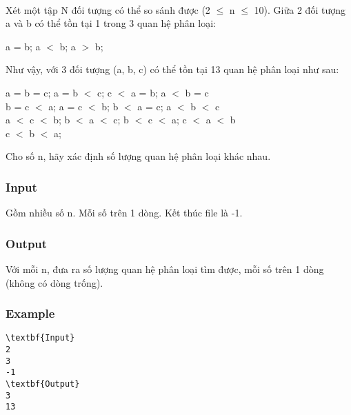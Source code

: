 

 

Xét một tập N đối tượng có thể so sánh được (2 $\le$ n $\le$ 10). Giữa 2 đối tượng a và b có thể tồn tại 1 trong 3 quan hệ phân loại:

a = b; a $<$ b; a $>$ b;

Như vậy, với 3 đối tượng (a, b, c) có thể tồn tại 13 quan hệ phân loại như sau:

a = b = c; a = b $<$ c; c $<$ a = b; a $<$ b = c
\\b = c $<$ a; a = c $<$ b; b $<$ a = c; a $<$ b $<$ c
\\a $<$ c $<$ b; b $<$ a $<$ c; b $<$ c $<$ a; c $<$ a $<$ b
\\c $<$ b $<$ a;

Cho số n, hãy xác định số lượng quan hệ phân loại khác nhau.

\subsubsection{Input}

Gồm nhiều số n. Mỗi số trên 1 dòng. Kết thúc file là -1.

\subsubsection{Output}

Với mỗi n, đưa ra số lượng quan hệ phân loại tìm được, mỗi số trên 1 dòng (không có dòng trống).

\subsubsection{Example}
\begin{verbatim}
\textbf{Input}
2
3
-1
\textbf{Output}
3
13
\end{verbatim}
